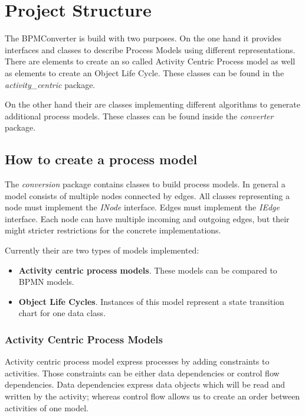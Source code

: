 \section{Project Structure}

The BPMConverter is build with two purposes.
On the one hand it provides interfaces and classes to describe Process Models using different representations.
There are elements to create an so called Activity Centric Process model as well as elements to create an Object Life Cycle.
These classes can be found in the \textit{activity\_centric} package.

On the other hand their are classes implementing different algorithms to generate additional process models.
These classes can be found inside the \textit{converter} package.

\subsection{How to create a process model}

The \textit{conversion} package contains classes to build process models.
In general a model consists of multiple nodes connected by edges.
All classes representing a node must implement the \textit{INode} interface.
Edges must implement the \textit{IEdge} interface.
Each node can have multiple incoming and outgoing edges, but their might stricter restrictions for the concrete implementations.

Currently their are two types of models implemented:
\begin{itemize}
	\item \textbf{Activity centric process models}. These models can be compared to BPMN models.
	\item \textbf{Object Life Cycles}. Instances of this model represent a state transition chart for one data class.
\end{itemize}

\subsubsection{Activity Centric Process Models}

Activity centric process model express processes by adding constraints to activities.
Those constraints can be either data dependencies or control flow dependencies.
Data dependencies express data objects which will be read and written by the activity;
whereas control flow allows us to create an order between activities of one model.

